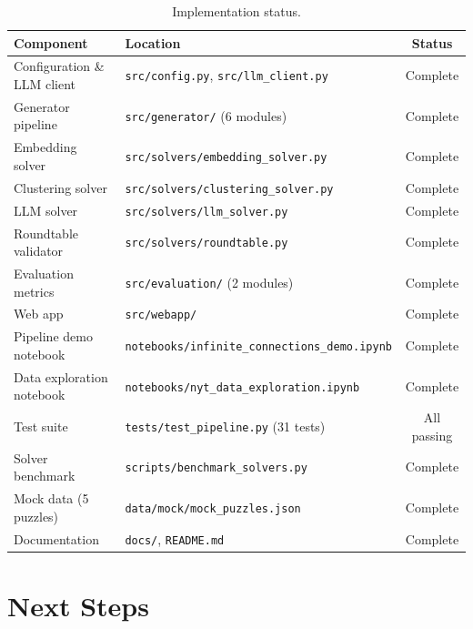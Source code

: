 \documentclass[11pt]{article}
\begin{document}
\begin{table}[h]
\centering
\caption{Implementation status.}
\begin{tabular}{@{}llc@{}}
\toprule
Component & Location & Status \\
\midrule
Configuration \& LLM client & \texttt{src/config.py}, \texttt{src/llm\_client.py} & Complete \\
Generator pipeline          & \texttt{src/generator/} (6 modules)               & Complete \\
Embedding solver            & \texttt{src/solvers/embedding\_solver.py}          & Complete \\
Clustering solver           & \texttt{src/solvers/clustering\_solver.py}         & Complete \\
LLM solver                  & \texttt{src/solvers/llm\_solver.py}               & Complete \\
Roundtable validator        & \texttt{src/solvers/roundtable.py}                & Complete \\
Evaluation metrics          & \texttt{src/evaluation/} (2 modules)              & Complete \\
Web app                     & \texttt{src/webapp/}                              & Complete \\
Pipeline demo notebook      & \texttt{notebooks/infinite\_connections\_demo.ipynb} & Complete \\
Data exploration notebook   & \texttt{notebooks/nyt\_data\_exploration.ipynb}   & Complete \\
Test suite                  & \texttt{tests/test\_pipeline.py} (31 tests)       & All passing \\
Solver benchmark            & \texttt{scripts/benchmark\_solvers.py}            & Complete \\
Mock data (5 puzzles)       & \texttt{data/mock/mock\_puzzles.json}             & Complete \\
Documentation               & \texttt{docs/}, \texttt{README.md}               & Complete \\
\bottomrule
\end{tabular}
\end{table}

\section{Next Steps}
\end{document}
